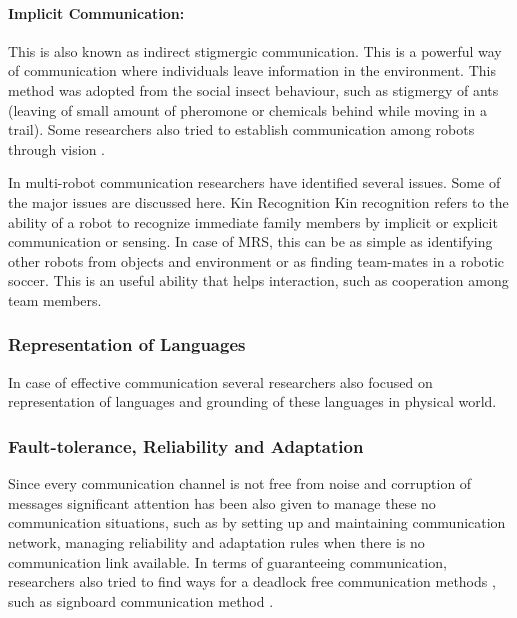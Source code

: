 \paragraph{Implicit Communication:} 
This is also known as indirect stigmergic communication. This is a powerful way of communication where individuals leave information in the environment. This method was adopted from the social insect behaviour, such as stigmergy of ants (leaving of small amount of pheromone or chemicals behind while moving in a trail). Some researchers also tried to establish communication among robots through vision \cite{Kuniyoshi1994}.

In multi-robot communication researchers have identified several issues. Some of the major issues are discussed here.
Kin Recognition
Kin recognition refers to the ability of a robot to recognize immediate family members by implicit or explicit communication or sensing. In case of MRS, this can be as simple as identifying other robots from objects and environment or as finding team-mates in a robotic soccer. This is an useful ability that helps interaction, such as cooperation among team members. 

\subsubsection*{Representation of Languages}
In case of effective communication several researchers also focused on representation of languages and grounding of these languages in physical world.

\subsubsection*{Fault-tolerance, Reliability and Adaptation}  
Since every communication channel is not free from noise and corruption of messages significant attention has been also given to manage these no communication situations, such as by setting up and maintaining communication network, managing reliability and adaptation rules when there is no communication link available. In terms of guaranteeing communication, researchers also tried to find ways for a deadlock free communication methods \cite{Arkin1998}, such as signboard communication method \cite{Wang1989}.


